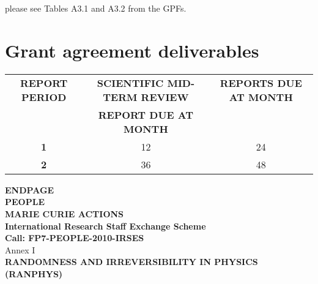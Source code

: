 \documentclass[12pt]{article}
\begin{document}
please see
Tables A3.1 and A3.2 from the GPFs.



\section{Grant agreement deliverables}


\begin{center}
{
\begin{tabular}{|c|c|c|}
\hline
{\bf REPORT PERIOD }&{\bf SCIENTIFIC MID-TERM REVIEW}&{\bf REPORTS DUE AT MONTH}\\
 {\bf}&{\bf REPORT DUE AT MONTH }&\\
\hline
{\bf 1} &12 &24\\
\hline
{\bf 2} &36 &48\\
\hline
\end{tabular}
}
\end{center}

\newpage
\pagestyle{empty}
\begin{center}
{\Large
{\bf ENDPAGE}\\
$\;$\\
$\;$\\
$\;$\\
{\bf PEOPLE  \\
MARIE CURIE ACTIONS \\
$\;$\\
International Research Staff Exchange Scheme\\
$\;$\\
Call: FP7-PEOPLE-2010-IRSES}\\
$\;$\\
$\;$\\
Annex I
$\;$\\
$\;$\\
$\;$\\
{\bf RANDOMNESS AND IRREVERSIBILITY IN PHYSICS\\(RANPHYS)}
}
\end{center}
\end{document}

